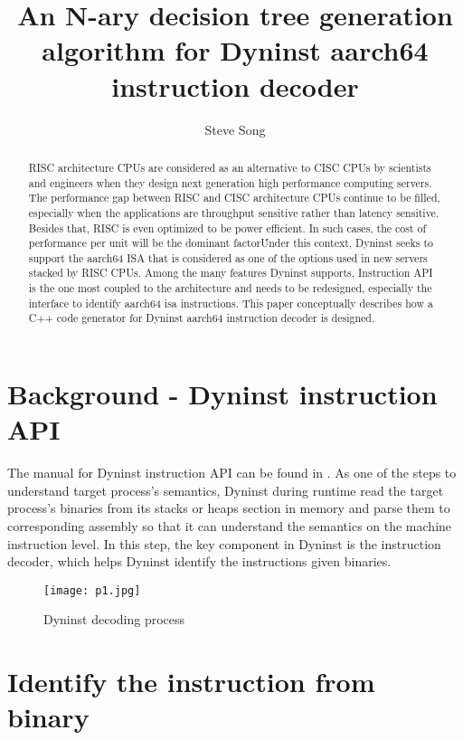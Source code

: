 \documentclass[]{article}
\title{An N-ary decision tree generation algorithm for Dyninst aarch64 instruction decoder}
\author{Steve Song}
\begin{document}
\maketitle

\begin{abstract}
RISC architecture CPUs are considered as an alternative to CISC CPUs by scientists and engineers when they design next generation high performance computing servers. The performance gap between RISC and CISC architecture CPUs continue to be filled, especially when the applications are throughput sensitive rather than latency sensitive. Besides that, RISC is even optimized to be power efficient. In such cases, the cost of performance per unit will be the dominant factor\cite{WEBSITE:riscserver}\. Under this context, Dyninst seeks to support the aarch64 ISA that is considered as one of the options used in new servers stacked by RISC CPUs. Among the many features Dyninst supports, Instruction API is the one most coupled to the architecture and needs to be redesigned, especially the interface to identify aarch64 isa instructions. This paper conceptually describes how a C++ code generator for Dyninst aarch64 instruction decoder is designed.

\end{abstract}

\section{Background - Dyninst instruction API}

The manual for Dyninst instruction API can be found in \cite{WEBSITE:DyninstInstrutionAPI}. As one of the steps to understand target process’s semantics, Dyninst during runtime read the target process’s binaries from its stacks or heaps section in memory and parse them to corresponding assembly so that it can understand the semantics on the machine instruction level. In this step, the key component in Dyninst is the instruction decoder, which helps Dyninst identify the instructions given binaries.

\begin{figure}[h]
	\texttt{[image: p1.jpg]}
	\caption{Dyninst decoding process}
	\label{fig:dyninstdecoding}
\end{figure}

\section{Identify the instruction from binary}
\end{document}
